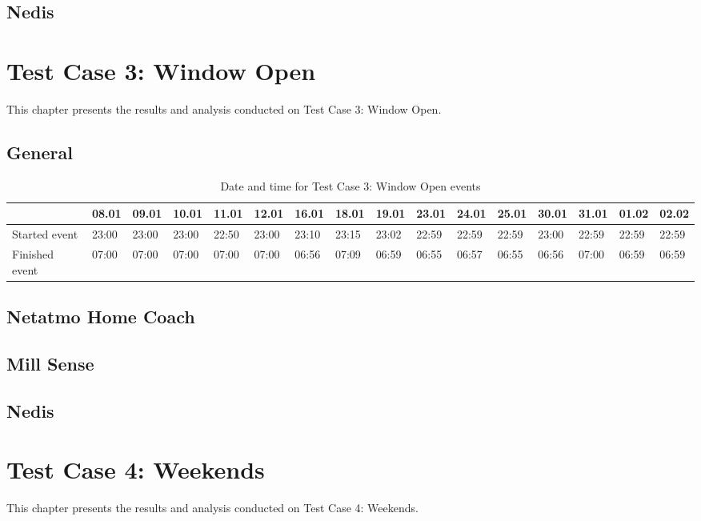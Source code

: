 \subsection{Nedis}

\section{Test Case 3: Window Open}
This chapter presents the results and analysis conducted on Test Case 3: Window Open. 
\subsection{General}
\begin{table}[!hbtp]
    \centering
    \caption{Date and time for Test Case 3: Window Open events}
    \begin{adjustbox}{width=1\textwidth} 
            \begin{tabular}{l|l|l|l|l|l|l|l|l|l|l|l|l|l|l|l|}
                \cline{2-16}
                & 08.01 & 09.01 & 10.01 & 11.01 & 12.01 & 16.01 & 18.01 & 19.01 & 23.01 & 24.01 & 25.01 & 30.01 & 31.01 & 01.02 & 02.02 \\ \hline
                \multicolumn{1}{|l|}{Started event}  & 23:00 & 23:00 & 23:00 & 22:50 & 23:00 & 23:10 & 23:15 & 23:02 & 22:59 & 22:59 & 22:59 & 23:00 & 22:59 & 22:59 & 22:59 \\ \hline
                \multicolumn{1}{|l|}{Finished event} & 07:00 & 07:00 & 07:00 & 07:00 & 07:00 & 06:56 & 07:09 & 06:59 & 06:55 & 06:57 & 06:55 & 06:56 & 07:00 & 06:59 & 06:59 \\ \hline
            \end{tabular}
    \end{adjustbox}
    \label{tab:WindowDates}
\end{table}
\subsection{Netatmo Home Coach}
\subsection{Mill Sense}
\subsection{Nedis}

\section{Test Case 4: Weekends}
This chapter presents the results and analysis conducted on Test Case 4: Weekends. 
